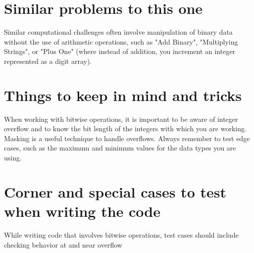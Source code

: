 \section*{Similar problems to this one}
Similar computational challenges often involve manipulation of binary data without the use of arithmetic operations, such as "Add Binary", "Multiplying Strings", or "Plus One" (where instead of addition, you increment an integer represented as a digit array).

\section*{Things to keep in mind and tricks}
When working with bitwise operations, it is important to be aware of integer overflow and to know the bit length of the integers with which you are working. Masking is a useful technique to handle overflows. Always remember to test edge cases, such as the maximum and minimum values for the data types you are using.

\section*{Corner and special cases to test when writing the code}
While writing code that involves bitwise operations, test cases should include checking behavior at and near overflow